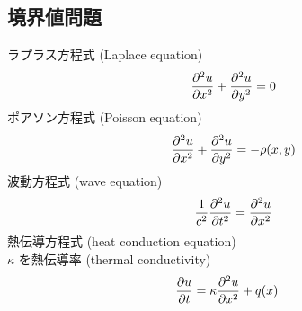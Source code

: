 \documentclass[uplatex,dvipdfmx,a4paper,11pt]{jlreq}
\theoremstyle{definition}
\begin{document}
\subsection{境界値問題}
\begin{definition}
  ラプラス方程式 (Laplace equation)
  \begin{align}
    \pdv[2]{u}{x} + \pdv[2]{u}{y} = 0
  \end{align}
  ポアソン方程式 (Poisson equation)
  \begin{align}
    \pdv[2]{u}{x} + \pdv[2]{u}{y} = -\rho(x, y)
  \end{align}
  波動方程式 (wave equation)
  \begin{align}
    \frac{1}{c^2}\pdv[2]{u}{t} = \pdv[2]{u}{x}
  \end{align}
  熱伝導方程式 (heat conduction equation) \\
  $\kappa$ を熱伝導率 (thermal conductivity)
  \begin{align}
    \pdv{u}{t} & = \kappa\pdv[2]{u}{x} + q(x)
  \end{align}
\end{definition}
\end{document}
